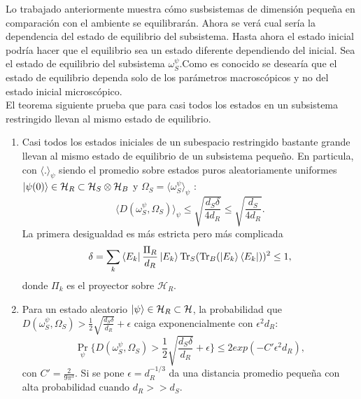Lo trabajado anteriormente muestra cómo susbsistemas de dimensión pequeña en comparación con el ambiente se equilibrarán. Ahora se verá cual sería la dependencia del estado de equilibrio del subsistema. Hasta ahora el estado inicial podría hacer que el equilibrio sea un estado diferente dependiendo del inicial. Sea el estado de equilibrio del subsistema $\omega_{S}^{\psi}$.Como es conocido se desearía que el estado de equilibrio dependa solo de los parámetros macroscópicos y no del estado inicial microscópico.
\\
El teorema siguiente prueba que para casi todos los estados en un subsistema restringido llevan al mismo estado de equilibrio.

\begin{theorem} \label{mismo estado}
\begin{enumerate}
\item Casi todos los estados iniciales de un subespacio restringido bastante grande llevan al mismo estado de equilibrio de un subsistema pequeño. En particula, con $\langle .\rangle_{\psi}$ siendo el promedio sobre estados puros aleatoriamente uniformes $\ket{\psi(0)} \in \mathcal{H}_{R} \subset \mathcal{H}_{S} \otimes \mathcal{H}_{B}$ y $\Omega_{S}= \langle \omega_{S}^{\psi} \rangle_{\psi}$ :
\begin{equation}
\langle D(\omega_{S}^{\psi}, \Omega_{S}) \rangle_{\psi} \leq \sqrt{\frac{d_{S} \delta}{4d_{R}}} \leq \sqrt{\frac{d_{S}}{4d_{R}}}.
\end{equation}
La primera desigualdad es más estricta pero más complicada 
\begin{equation}
\delta= \sum_{k}\bra{E_{k}}\frac{\Pi_{R}}{d_{R}}\ket{E_{k}} \Tr_{S} ( \Tr_{B} (\ket{E_{k}} \bra{E_{k}}) )^{2} \leq  1,
\end{equation}
donde $\Pi_{k}$ es el proyector sobre $\mathcal{H}_{R}$.

\item Para un estado aleatorio $\ket{\psi} \in \mathcal{H}_{R}\subset \mathcal{H}$, la probabilidad que $D(\omega_{S}^{\psi},\Omega_{S}) > \frac{1}{2} \sqrt{\frac{d_{S} \delta}{d_{R}}}+ \epsilon$ caiga exponencialmente con $\epsilon^{2}d_{R}$:
\begin{equation}
\Pr_{\psi} \bigg \{ D(\omega_{S}^{\psi}, \Omega_{S}) > \frac{1}{2}\sqrt{\frac{d_{S} \delta}{d_{R}}} + \epsilon \bigg \} \leq 2exp(-C'\epsilon^{2}d_{R}),
\end{equation}
con $C'=\frac{2}{9 \pi^{3}}$. Si se pone $\epsilon=d_{R}^{-1/3}$ da una distancia promedio pequeña con alta probabilidad cuando $d_{R}>>d_{S}$.
\end{enumerate}
\end{theorem}

